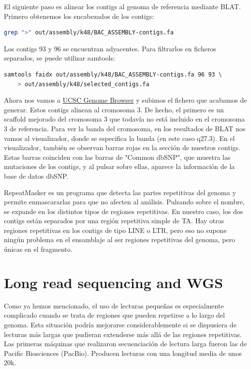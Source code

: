 El siguiente paso es alinear los contigs al genoma de referencia mediante BLAT. Primero obtenemos los encabezados de los contigs:
\begin{lstlisting}[language=bash]
grep ">" out/assembly/k48/BAC_ASSEMBLY-contigs.fa
\end{lstlisting}

Los contigs 93 y 96 se encuentran adyacentes. Para filtrarlos en ficheros separados, se puede utilizar samtools:
\begin{lstlisting}[language=bash]
samtools faidx out/assembly/k48/BAC_ASSEMBLY-contigs.fa 96 93 \
    > out/assembly/k48/selected_contigs.fa
\end{lstlisting}
Ahora nos vamos a \href{http://genome.ucsc.edu}{UCSC Genome Browser} y subimos el fichero que acabamos de generar. Estos contigs alinean al cromosoma 3. De hecho, el primero es un scaffold mejorado del cromosoma 3 que todavía no está incluido en el cromosoma 3 de referencia. Para ver la banda del cromosoma, en los resultados de BLAT nos vamos al visualizador, donde se especifica la banda (en este caso q27.3). En el visualizador, también se observan barras rojas en la sección de nuestros contigs. Estas barras coinciden con las barras de "Common dbSNP", que muestra las mutaciones de los contigs, y al pulsar sobre ellas, aparece la información de la base de datos dbSNP.

RepeatMasker es un programa que detecta las partes repetitivas del genoma y permite enmascararlas para que no afecten al análisis. Pulsando sobre el nombre, se expande en los distintos tipos de regiones repetitivas. En nuestro caso, los dos contigs están separados por una región repetitiva simple de TA. Hay otras regiones repetitivas en los contigs de tipo LINE o LTR, pero eso no supone ningún problema en el ensamblaje al ser regiones repetitivas del genoma, pero únicas en el fragmento. 

\section{Long read sequencing and WGS}
Como ya hemos mencionado, el uso de lecturas pequeñas es especialmente complicado cuando se trata de regiones que pueden repetirse a lo largo del genoma. Esta situación podría mejorarse considerablemente si se dispusiera de lecturas más largas que pudieran extenderse más allá de las regiones repetitivas. Las primeras máquinas que realizaron secuenciación de lectura larga fueron las de Pacific Biosciences (PacBio). Producen lecturas con una longitud media de unos 20k.

